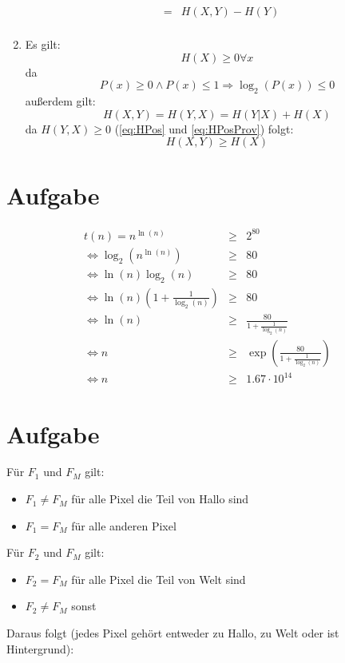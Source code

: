 \documentclass[DIN, pagenumber=false, fontsize=11pt, parskip=half]{scrartcl}
\begin{document}
\begin{enumerate}[label=\alph*)]
\begin{eqnarray*}
                       &=& H(X,Y) - H(Y)\\
            \end{eqnarray*}
        \item
            Es gilt:
            \begin{equation} \label{eq:HPos}
                H(X) \geq 0 \forall x
            \end{equation}
            da
            \begin{equation} \label{eq:HPosProv}
                P(x) \geq 0 \land P(x) \leq 1 \Rightarrow \log_2(P(x)) \leq 0
            \end{equation} 
            außerdem gilt:
            \begin{equation}
                H(X, Y) = H(Y, X) = H(Y|X) + H(X)
            \end{equation}
            da $H(Y,X) \geq 0$ (\ref{eq:HPos} und \ref{eq:HPosProv}) folgt:
            \begin{equation}
                H(X, Y) \geq H(X)
            \end{equation}
    \end{enumerate}

    \section{Aufgabe}
    \begin{eqnarray*}
        t(n) = n^{\ln(n)} &\geq& 2^{80} \\
        \Leftrightarrow \log_2 \left(n^{\ln(n)}\right) &\geq& 80\\
        \Leftrightarrow \ln(n) \log_2(n) &\geq& 80 \\
        \Leftrightarrow \ln(n) \left(1 + \frac{1}{\log_2(n)} \right) &\geq& 80 \\
        \Leftrightarrow \ln(n) &\geq& \frac{80}{1 + \frac{1}{\log_2(n)}} \\
        \Leftrightarrow n &\geq& \exp\left(\frac{80}{1 + \frac{1}{\log_2(n)}}\right) \\
        \Leftrightarrow n &\geq& 1.67 \cdot 10^{14}
    \end{eqnarray*}

    \section{Aufgabe}
    Für $F_1$ und $F_M$ gilt:
    \begin{itemize}
        \item $F_1 \neq F_M$ für alle Pixel die Teil von \glqq{}Hallo\grqq{} sind
        \item $F_1 = F_M$ für alle anderen Pixel
    \end{itemize}
    Für $F_2$ und $F_M$ gilt:
    \begin{itemize}
        \item $F_2 = F_M$ für alle Pixel die Teil von \glqq{}Welt\grqq{} sind
        \item $F_2 \neq F_M$ sonst
    \end{itemize}
    Daraus folgt (jedes Pixel gehört entweder zu \glqq{}Hallo\grqq{}, zu \glqq{}Welt\grqq{} oder ist Hintergrund):
\end{document}
